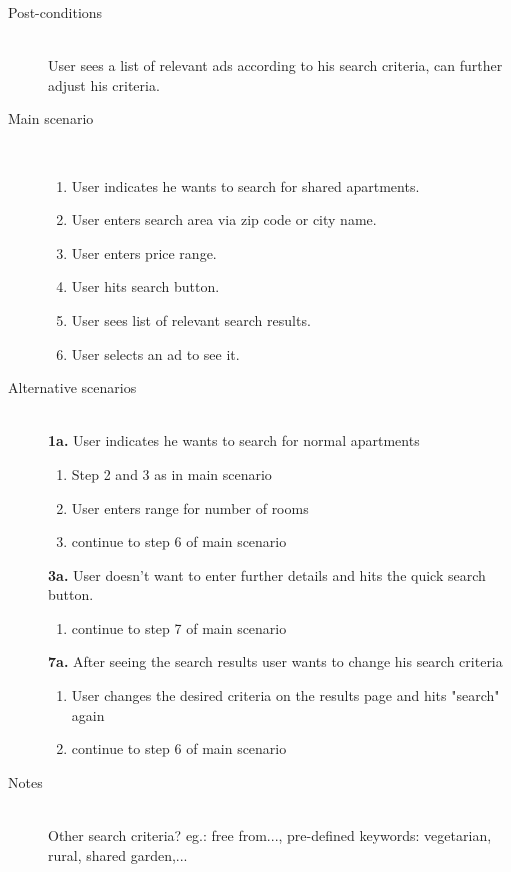 \documentclass[a4wide]{article}
\begin{document}
\begin{description}
\item[Post-conditions]\mbox{}\\
User sees a list of relevant ads according to his search criteria, can further adjust his criteria.
\item[Main scenario]\mbox{}\\
\begin{enumerate}
\item User indicates he wants to search for shared apartments.
\item User enters search area via zip code or city name. %
\item User enters price range.
\item User hits search button.
\item User sees list of relevant search results.
\item User selects an ad to see it.
\end{enumerate}
\item[Alternative scenarios]\mbox{}\\
\textbf{1a.} User indicates he wants to search for normal apartments
\begin{enumerate}
\item Step 2 and 3 as in main scenario
\item User enters range for number of rooms
\item continue to step 6 of main scenario
\end{enumerate}
\textbf{3a.} User doesn't want to enter further details and hits the quick search button.
\begin{enumerate}
\item continue to step 7 of main scenario
\end{enumerate}
\textbf{7a.} After seeing the search results user wants to change his search criteria
\begin{enumerate}
\item User changes the desired criteria on the results page and hits "search" again
\item continue to step 6 of main scenario
\end{enumerate}
\item[Notes]\mbox{}\\
Other search criteria? eg.: free from..., pre-defined keywords: vegetarian, rural, shared garden,...
\end{description}
\end{document}
